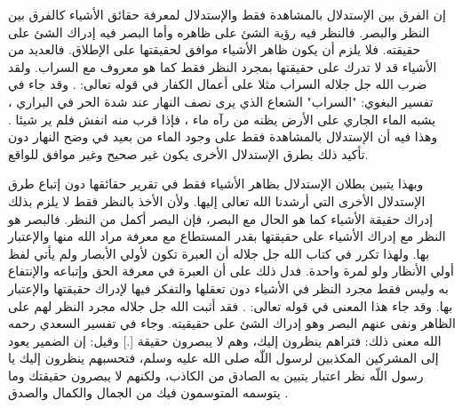 إن الفرق بين الإستدلال بالمشاهدة فقط والإستدلال لمعرفة حقائق الأشياء كالفرق بين النظر والبصر. فالنظر فيه رؤية الشئ على ظاهره وأما البصر فيه إدراك الشئ على حقيقته. فلا يلزم أن يكون ظاهر الأشياء موافق لحقيقتها على الإطلاق. فالعديد من الأشياء قد لا تدرك على حقيقتها بمجرد النظر فقط كما هو معروف مع السراب. ولقد ضرب الله جل جلاله السراب مثلا على أعمال الكفار في قوله تعالى: \quranayah*[24][39]{\footnotesize \surahname*[24]}. وقد جاء في تفسير البغوي: "السراب" الشعاع الذي يرى نصف النهار عند شدة الحر في البراري ، يشبه الماء الجاري على الأرض يظنه من رآه ماء ، فإذا قرب منه انفش فلم ير شيئا \cite{tafsir_Baghawi}. وهذا فيه أن الإستدلال بالمشاهدة فقط على وجود الماء من بعيد في وضح النهار دون تأكيد ذلك بطرق الإستدلال الأخرى يكون غير صحيح وغير موافق للواقع. 


وبهذا يتبين بطلان الإستدلال بظاهر الأشياء فقط في تقرير حقائقها دون إتباع طرق الإستدلال الأخرى التي أرشدنا الله تعالى إليها. ولأن الأخذ بالنظر فقط لا يلزم بذلك إدراك حقيقة الأشياء كما هو الحال مع البصر، فإن البصر أكمل من النظر. فالبصر هو النظر مع إدراك الأشياء على حقيقتها بقدر المستطاع مع معرفة مراد الله منها والإعتبار بها. ولهذا تكرر في كتاب الله جل جلاله أن العبرة تكون لأولي الأبصار ولم يأتي لفظ أولي الأنظار ولو لمرة واحدة. فدل ذلك على أن العبرة في معرفة الحق وإتباعه والإنتفاع به وليس فقط مجرد النظر في الأشياء دون تعقلها والتفكر فيها لإدراك حقيقتها والإعتبار بها.
وقد جاء هذا المعنى في قوله تعالى: \quranayah*[7][198]{\footnotesize \surahname*[7]}. فقد أثبت الله جل جلاله مجرد النظر لهم على الظاهر ونفى عنهم البصر وهو إدراك الشئ على حقيقيته. وجاء في تفسير السعدي رحمه الله معنى ذلك: فتراهم ينظرون إليك، وهم لا يبصرون حقيقة [.] وقيل: إن الضمير يعود إلى المشركين المكذبين لرسول اللّه صلى الله عليه وسلم، فتحسبهم ينظرون إليك يا رسول اللّه نظر اعتبار يتبين به الصادق من الكاذب، ولكنهم لا يبصرون حقيقتك وما يتوسمه المتوسمون فيك من الجمال والكمال والصدق \cite{tafsir_Saadi}.


